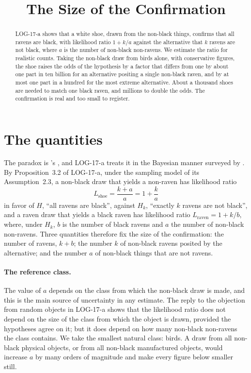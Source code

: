 \documentclass{situationist-preprint}
\title{The Size of the Confirmation}
\begin{document}
\maketitle

\begin{abstract}
LOG-17-a shows that a white shoe, drawn from the non-black things, confirms that all ravens are black, with likelihood ratio $1 + k/a$ against the alternative that $k$ ravens are not black, where $a$ is the number of non-black non-ravens. We estimate the ratio for realistic counts. Taking the non-black draw from birds alone, with conservative figures, the shoe raises the odds of the hypothesis by a factor that differs from one by about one part in ten billion for an alternative positing a single non-black raven, and by at most one part in a hundred for the most extreme alternative. About a thousand shoes are needed to match one black raven, and millions to double the odds. The confirmation is real and too small to register.
\end{abstract}

\section{The quantities}

The paradox is \citeauthor{Hempel1945}'s \citeyearpar{Hempel1945}, and LOG-17-a treats it in the Bayesian manner surveyed by \citet{FitelsonHawthorne2010}. By Proposition~3.2 of LOG-17-a, under the sampling model of its Assumption~2.3, a non-black draw that yields a non-raven has likelihood ratio
\[
L_{\mathrm{shoe}} = \frac{k + a}{a} = 1 + \frac{k}{a}
\]
in favor of $H$, \enquote{all ravens are black}, against $H_k$, \enquote{exactly $k$ ravens are not black}, and a raven draw that yields a black raven has likelihood ratio $L_{\mathrm{raven}} = 1 + k/b$, where, under $H_k$, $b$ is the number of black ravens and $a$ the number of non-black non-ravens. Three quantities therefore fix the size of the confirmation: the number of ravens, $k + b$; the number $k$ of non-black ravens posited by the alternative; and the number $a$ of non-black things that are not ravens.

\paragraph{The reference class.} The value of $a$ depends on the class from which the non-black draw is made, and this is the main source of uncertainty in any estimate. The reply to the objection from random objects in LOG-17-a shows that the likelihood ratio does not depend on the size of the class from which the object is drawn, provided the hypotheses agree on it; but it does depend on how many non-black non-ravens the class contains. We take the smallest natural class: birds. A draw from all non-black physical objects, or from all non-black manufactured objects, would increase $a$ by many orders of magnitude and make every figure below smaller still.
\end{document}
